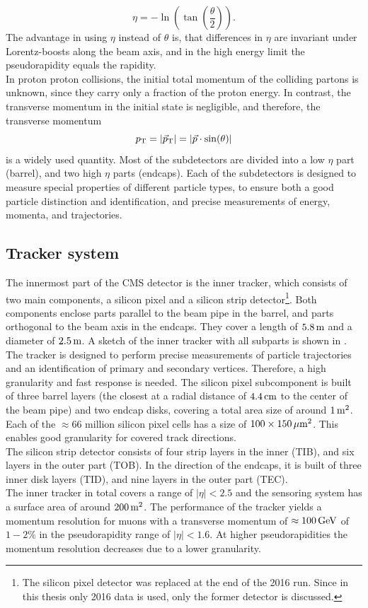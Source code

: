 \begin{equation}
 \eta=-\ln\left(\tan\left(\frac{\theta}{2}\right)\right).
\end{equation}
The advantage in using $\eta$ instead of $\theta$ is, that differences in $\eta$ are invariant under Lorentz-boosts along the beam axis, and in the high energy limit the pseudorapidity equals the rapidity.\\
In proton proton collisions, the initial total momentum of the colliding partons is unknown, since they carry only a fraction of the proton energy. In contrast, the transverse momentum in the initial state is negligible, and therefore, the transverse momentum
\begin{equation}
 p_{\mathrm{T}}=|{\vec p}_{\mathrm{T}}|=|\vec{p}\cdot\sin(\theta)|
\end{equation}
is a widely used quantity.
Most of the subdetectors are divided into a low $\eta$ part (barrel), and two high $\eta$ parts (endcaps). Each of the subdetectors is designed to measure special properties of different particle types, to ensure both a good particle distinction and identification, and precise measurements of energy, momenta, and trajectories.



\subsection{Tracker system}
The innermost part of the CMS detector is the inner tracker, which consists of two main components, a silicon pixel and a silicon strip detector\footnote{The silicon pixel detector was replaced at the end of the 2016 run. Since in this thesis only 2016 data is used, only the former detector is discussed.}. Both components enclose parts parallel to the beam pipe in the barrel, and parts orthogonal to the beam axis in the endcaps. They cover a length of $5.8\,\text{m}$ and a diameter of $2.5\,\text{m}$. A sketch of the inner tracker with all subparts is shown in . The tracker is designed to perform precise measurements of particle trajectories and an identification of primary and secondary vertices. Therefore, a high granularity and fast response is needed. The silicon pixel subcomponent is built of three barrel layers (the closest at a radial distance of $4.4\,\text{cm}$ to the center of the beam pipe) and two endcap disks, covering a total area size of around $1\,\text{m}^2$. Each of the $\approx66$ million silicon pixel cells has a size of $100\times150\,\mu\text{m}^2$. This enables good granularity for covered track directions.\\
The silicon strip detector consists of four strip layers in the inner (TIB), and six layers in the outer part (TOB). In the direction of the endcaps, it is built of three inner disk layers (TID), and nine layers in the outer part (TEC).\\
The inner tracker in total covers a range of $|\eta|<2.5$ and the sensoring system has a surface area of around $200\,\text{m}^2$. The performance of the tracker yields a momentum resolution for muons with a transverse momentum of $\approx100\,\text{Ge\hspace{-.08em}V}$ of $1-2\%$ in the pseudorapidity range of $|\eta|<1.6$. At higher pseudorapidities the momentum resolution decreases due to a lower granularity.

